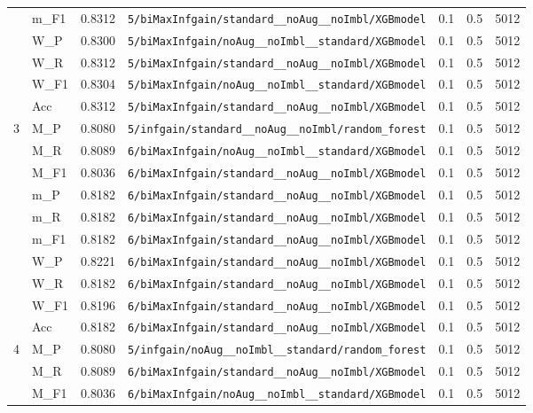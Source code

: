 \begin{table}[htbp]
\begin{tabular}{|c|l|c|>{\ttfamily\footnotesize}p{7.2cm}|c|c|c|}
 & m\_F1 & 0.8312 & \texttt{5/biMaxInfgain/standard\_\_noAug\_\_noImbl/XGBmodel} & 0.1 & 0.5  & 5012 \\ 
 & W\_P & 0.8300 & \texttt{5/biMaxInfgain/noAug\_\_noImbl\_\_standard/XGBmodel} & 0.1 & 0.5  & 5012 \\ 
 & W\_R & 0.8312 & \texttt{5/biMaxInfgain/standard\_\_noAug\_\_noImbl/XGBmodel} & 0.1 & 0.5  & 5012 \\ 
 & W\_F1 & 0.8304 & \texttt{5/biMaxInfgain/noAug\_\_noImbl\_\_standard/XGBmodel} & 0.1 & 0.5  & 5012 \\ 
 & Acc & 0.8312 & \texttt{5/biMaxInfgain/standard\_\_noAug\_\_noImbl/XGBmodel} & 0.1 & 0.5  & 5012 \\ 
\hline
\multirow{10}{*}{3} & M\_P & 0.8080 & \texttt{5/infgain/standard\_\_noAug\_\_noImbl/random\_forest} & 0.1 & 0.5  & 5012 \\ 
 & M\_R & 0.8089 & \texttt{6/biMaxInfgain/noAug\_\_noImbl\_\_standard/XGBmodel} & 0.1 & 0.5  & 5012 \\ 
 & M\_F1 & 0.8036 & \texttt{6/biMaxInfgain/standard\_\_noAug\_\_noImbl/XGBmodel} & 0.1 & 0.5  & 5012 \\ 
 & m\_P & 0.8182 & \texttt{6/biMaxInfgain/standard\_\_noAug\_\_noImbl/XGBmodel} & 0.1 & 0.5  & 5012 \\ 
 & m\_R & 0.8182 & \texttt{6/biMaxInfgain/standard\_\_noAug\_\_noImbl/XGBmodel} & 0.1 & 0.5  & 5012 \\ 
 & m\_F1 & 0.8182 & \texttt{6/biMaxInfgain/standard\_\_noAug\_\_noImbl/XGBmodel} & 0.1 & 0.5  & 5012 \\ 
 & W\_P & 0.8221 & \texttt{6/biMaxInfgain/standard\_\_noAug\_\_noImbl/XGBmodel} & 0.1 & 0.5  & 5012 \\ 
 & W\_R & 0.8182 & \texttt{6/biMaxInfgain/standard\_\_noAug\_\_noImbl/XGBmodel} & 0.1 & 0.5  & 5012 \\ 
 & W\_F1 & 0.8196 & \texttt{6/biMaxInfgain/standard\_\_noAug\_\_noImbl/XGBmodel} & 0.1 & 0.5  & 5012 \\ 
 & Acc & 0.8182 & \texttt{6/biMaxInfgain/standard\_\_noAug\_\_noImbl/XGBmodel} & 0.1 & 0.5  & 5012 \\ 
\hline
\multirow{10}{*}{4} & M\_P & 0.8080 & \texttt{5/infgain/noAug\_\_noImbl\_\_standard/random\_forest} & 0.1 & 0.5  & 5012 \\ 
 & M\_R & 0.8089 & \texttt{6/biMaxInfgain/standard\_\_noAug\_\_noImbl/XGBmodel} & 0.1 & 0.5  & 5012 \\ 
 & M\_F1 & 0.8036 & \texttt{6/biMaxInfgain/noAug\_\_noImbl\_\_standard/XGBmodel} & 0.1 & 0.5  & 5012 \\ 

\end{tabular}
\end{table}
